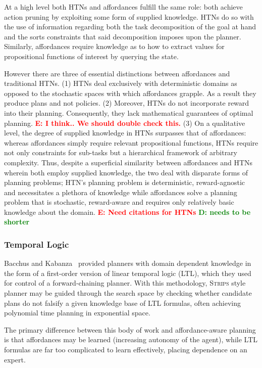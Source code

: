 \documentclass[conference]{IEEEtran}
\newcommand{\dnote}[1]{\textcolor{Green}{\textbf{D: #1}}}
\newcommand{\enote}[1]{\textcolor{Red}{\textbf{E: #1}}}
\begin{document}
At a high level both HTNs and affordances fulfill the same role: both achieve action pruning by exploiting some form of supplied knowledge. HTNs do so with the use of information regarding both the task decomposition of the goal at hand and the sorts constraints that said decomposition imposes upon the planner. Similarly, affordances require knowledge as to how to extract values for propositional functions of interest by querying the state.

However there are three of essential distinctions between affordances and traditional HTNs. (1) HTNs deal exclusively with deterministic domains as opposed to the stochastic spaces with which affordances grapple. As a result they produce plans and not policies. (2) Moreover, HTNs do not incorporate reward into their planning. Consequently, they lack mathematical guarantees of optimal planning. \enote{I think.. We should double check this.} (3) On a qualitative level, the degree of supplied knowledge in HTNs surpasses that of affordances: whereas affordances simply require relevant propositional functions, HTNs require not only constraints for sub-tasks but a hierarchical framework of arbitrary complexity. Thus, despite a superficial similarity between affordances and HTNs wherein both employ supplied knowledge, the two deal with disparate forms of planning problems; HTN's planning problem is deterministic, reward-agnostic and necessitates a plethora of knowledge while affordances solve a planning problem that is stochastic, reward-aware and requires only relatively basic knowledge about the domain.
\enote{Need citations for HTNs}
\dnote{needs to be shorter}
\subsubsection{Temporal Logic}

Bacchus and Kabanza~\cite{Bacchus95usingtemporal,Bacchus99usingtemporal} provided
planners with domain dependent knowledge in the form of a first-order version of linear
temporal logic (LTL), which they used for control of a forward-chaining planner. With this methodology, 
\textsc{Strips} style planner may be guided through the search space by checking 
whether candidate plans do not falsify a given knowledge base of LTL formulas, often
achieving polynomial time planning in exponential space.

The primary difference between this body of work and affordance-aware planning is that affordances may be learned (increasing autonomy of the agent), while LTL formulas are far too complicated to learn effectively, placing dependence on an expert.
\end{document}
